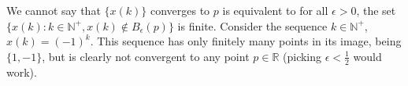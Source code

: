 We cannot say that $\{ x(k) \}$ converges to $p$ is equivalent to for all $\epsilon > 0$, the set $\{ x(k) : k \in \mathbb{N}^+, x(k) \not \in B_ \epsilon(p) \}$ is finite. Consider the sequence $k \in \mathbb{N}^+$, $x(k) = (-1)^k$. This sequence has only finitely many points in its image, being $\{ 1, -1 \}$, but is clearly not convergent to any point $p \in \mathbb{R}$ (picking $\epsilon < \frac{1}{2}$ would work).
